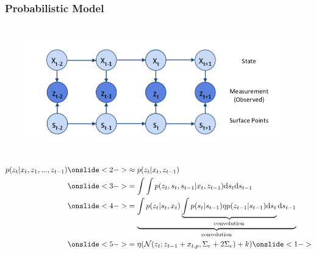 \begin{frame}
  \frametitle{Probabilistic Model}

  \begin{columns}
  \begin{column}{0.4\textwidth}
  \begin{description}[]
  \item[Measurement Model] \hfill \\
  \end{description}
  \end{column}
  \begin{column}{0.6\textwidth}
  \vspace{1cm}
  \includegraphics[width=0.9\textwidth]{../img/dbn}
  \end{column}
  \end{columns}
  \vspace{-1cm}
  \begin{align}     
    p(z_t|x_t,z_1,...,z_{t-1}) \onslide<2-> & \approx p(z_t|x_t,z_{t-1}) \nonumber\\
    \onslide<3-> &= \int \int p(z_t,s_t,s_{t-1}|x_t,z_{t-1}) \mathrm d s_t \mathrm d s_{t-1} \nonumber\\
    \onslide<4-> &= \underbrace{\int p(z_t|s_t,x_t) \underbrace{\int p(s_t|s_{t-1})\eta p(z_{t-1}|s_{t-1}) \mathrm d s_t}_{\text{convolution}} \mathrm d s_{t-1}}_{\text{convolution}} \nonumber\\
    \onslide<5-> &= \eta(\mathcal{N}(z_t;z_{t-1}+x_{t,p},\Sigma_r+2\Sigma_e)+k) \nonumber
    \onslide<1->
  \end{align}
\end{frame}

\newcommand{\unaryminus}{\scalebox{0.75}[1.0]{\( - \)}}


